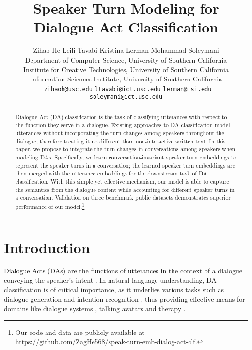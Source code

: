 \documentclass[11pt]{article}
\title{Speaker Turn Modeling for Dialogue Act Classification}
\author{
  Zihao He \quad Leili Tavabi \quad Kristina Lerman \quad Mohammad Soleymani \\
  Department of Computer Science, University of Southern California \\
  Institute for Creative Technologies, University of Southern California \\
  Information Sciences Institute, University of Southern California\\
  \footnotesize \texttt{ zihaoh@usc.edu} \quad \texttt{ltavabi@ict.usc.edu}  \quad \texttt{lerman@isi.edu}  \quad  \texttt{soleymani@ict.usc.edu} \\
  }
\begin{document}
\maketitle



\begin{abstract}
Dialogue Act (DA) classification is the task of classifying utterances with respect to the function they serve in a dialogue. Existing approaches to DA classification model utterances without incorporating the turn changes among speakers throughout the dialogue, therefore treating it no different than non-interactive written text. In this paper, we propose to integrate the turn changes in conversations among speakers when modeling DAs. Specifically, we learn conversation-invariant speaker turn embeddings to represent the speaker turns in a conversation; the learned speaker turn embeddings are then merged with the utterance embeddings for the downstream task of DA classification. With this simple yet effective mechanism, our model is able to capture the semantics from the dialogue content while accounting for different speaker turns in a conversation. Validation on three benchmark public datasets demonstrates superior performance of our model.\footnote{Our code and data are publicly available at \url{https://github.com/ZagHe568/speak-turn-emb-dialog-act-clf}.}
\end{abstract}

\section{Introduction}
\label{sec:intro}
Dialogue Acts (DAs) are the functions of utterances in the context of a dialogue conveying the speaker's intent \cite{searle1969speech}. 
In natural language understanding, DA classification is of critical importance, as it underlies various tasks such as dialogue generation \cite{li2017adversarial} and intention recognition \cite{higashinaka2006incorporating}, 
thus providing effective means for domains like dialogue systems \cite{higashinaka2014towards}, talking avatars \cite{xie2014statistical} and therapy \cite{xiao2016behavioral,tavabi2021analysis,tavabi2020multimodal}.
\end{document}

